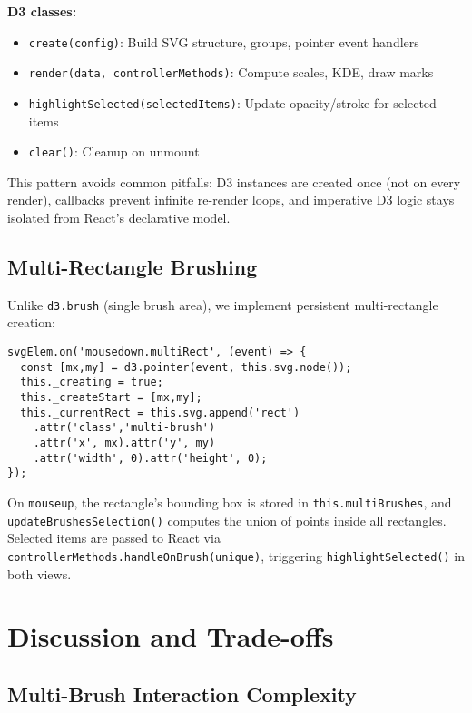 \documentclass[sigplan,screen]{acmart}
\begin{document}
\textbf{D3 classes:}
\begin{itemize}
\item \texttt{create(config)}: Build SVG structure, groups, pointer
      event handlers
\item \texttt{render(data, controllerMethods)}: Compute scales, KDE,
      draw marks
\item \texttt{highlightSelected(selectedItems)}: Update opacity/stroke
      for selected items
\item \texttt{clear()}: Cleanup on unmount
\end{itemize}

This pattern avoids common pitfalls: D3 instances are created once (not
on every render), callbacks prevent infinite re-render loops,
and imperative D3 logic stays isolated from React's declarative model.

\subsection{Multi-Rectangle Brushing}

Unlike \texttt{d3.brush} (single brush area), we implement persistent
multi-rectangle creation:

\begin{verbatim}
svgElem.on('mousedown.multiRect', (event) => {
  const [mx,my] = d3.pointer(event, this.svg.node());
  this._creating = true;
  this._createStart = [mx,my];
  this._currentRect = this.svg.append('rect')
    .attr('class','multi-brush')
    .attr('x', mx).attr('y', my)
    .attr('width', 0).attr('height', 0);
});
\end{verbatim}

On \texttt{mouseup}, the rectangle's bounding box is stored in
\texttt{this.multiBrushes}, and \texttt{updateBrushesSelection()}
computes the union of points inside all rectangles. Selected items are
passed to React via \texttt{controllerMethods.handleOnBrush(unique)},
triggering \texttt{highlightSelected()} in both views.

\section{Discussion and Trade-offs}
\label{sec:discussion}

\subsection{Multi-Brush Interaction Complexity}
\end{document}

